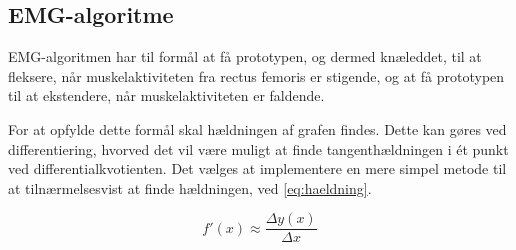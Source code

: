 \subsection{EMG-algoritme}
EMG-algoritmen har til formål at få prototypen, og dermed knæleddet, til at fleksere, når muskelaktiviteten fra rectus femoris er stigende, og at få prototypen til at ekstendere, når muskelaktiviteten er faldende. 

For at opfylde dette formål skal hældningen af grafen findes. Dette kan gøres ved differentiering, hvorved det vil være muligt at finde tangenthældningen i ét punkt ved differentialkvotienten. Det vælges at implementere en mere simpel metode til at tilnærmelsesvist at finde hældningen, ved \autoref{eq:haeldning}.

\begin{equation}
f'(x)\approx\dfrac{\Delta y(x)}{\Delta x}
\label{eq:haeldning}
\end{equation}

